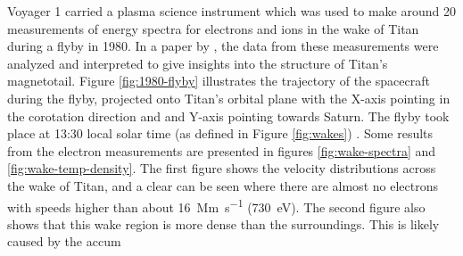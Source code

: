 \documentclass[12pt, parskip=full*, abstract]{scrartcl}
\begin{document}




Voyager 1 carried a plasma science instrument which was used to make around 20 measurements of energy spectra for electrons and ions in the wake of Titan during a flyby in 1980. In a paper by \textcite{hartle-1982}, the data from these measurements were analyzed and interpreted to give insights into the structure of Titan's magnetotail. Figure \ref{fig:1980-flyby} illustrates the trajectory of the spacecraft during the flyby, projected onto Titan's orbital plane with the X-axis pointing in the corotation direction and and Y-axis pointing towards Saturn. The flyby took place at 13:30 local solar time (as defined in Figure \ref{fig:wakes}) \parencite{ness-1982}. Some results from the electron measurements are presented in figures \ref{fig:wake-spectra} and \ref{fig:wake-temp-density}. The first figure shows the velocity distributions across the wake of Titan, and a clear  can be seen where there are almost no electrons with speeds higher than about \SI{16}{\mega\metre\per\second} (\SI{730}{\electronvolt}). The second figure also shows that this wake region is more dense than the surroundings. This is likely caused by the accum
\end{document}
